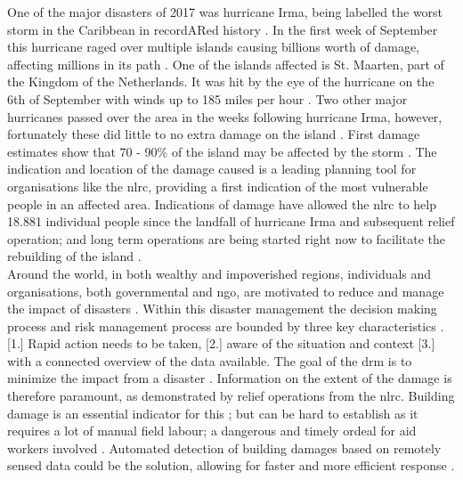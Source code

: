\noindent One of the major disasters of 2017 was hurricane Irma, being labelled the worst storm in the Caribbean in recordARed history \citep{Daniell2017}. In the first week of September this hurricane raged over multiple islands causing billions worth of damage, affecting millions in its path \citep{Phipps2017,Daniell2017}. One of the islands affected is St. Maarten, part of the Kingdom of the Netherlands. It was hit by the eye of the hurricane on the 6th of September with winds up to 185 miles per hour \citep{Wilts2017}. Two other major hurricanes passed over the area in the weeks following hurricane Irma, however, fortunately these did little to no extra damage on the island \citep{Gray2017,Bijnsdorp2017}. First damage estimates show that 70 - 90\% of the island may be affected by the storm \citep{Rodekruis2017,UNOSAT2017}. The indication and location of the damage caused is a leading planning tool for organisations like the \ac{nlrc}, providing a first indication of the most vulnerable people in an affected area. Indications of damage have allowed the \ac{nlrc} to help 18.881 individual people since the landfall of hurricane Irma and subsequent relief operation; and long term operations are being started right now to facilitate the rebuilding of the island \citep{Rodekruis2017}. \\

\noindent Around the world, in both wealthy and impoverished regions, individuals and organisations, both governmental and \ac{ngo}, are motivated to reduce and manage the impact of disasters \citep{Coppola2015}. Within this disaster management the decision making process and risk management process are bounded by three key characteristics \citep{Zlatanova2008}. [1.] Rapid action needs to be taken, [2.] aware of the situation and context [3.] with a connected overview of the data available. The goal of the \ac{drm} is to minimize the impact from a disaster \citep{Piero2012}. Information on the extent of the damage is therefore paramount, as demonstrated by relief operations from the \ac{nlrc}. Building damage is an essential indicator for this \citep{Schweier2006}; but can be hard to establish as it requires a lot of manual field labour; a dangerous and timely ordeal for aid workers involved \citep{Kerle2010}. Automated detection of building damages based on remotely sensed data could be the solution, allowing for faster and more efficient response \citep{Vetrivel2016b}. \\

